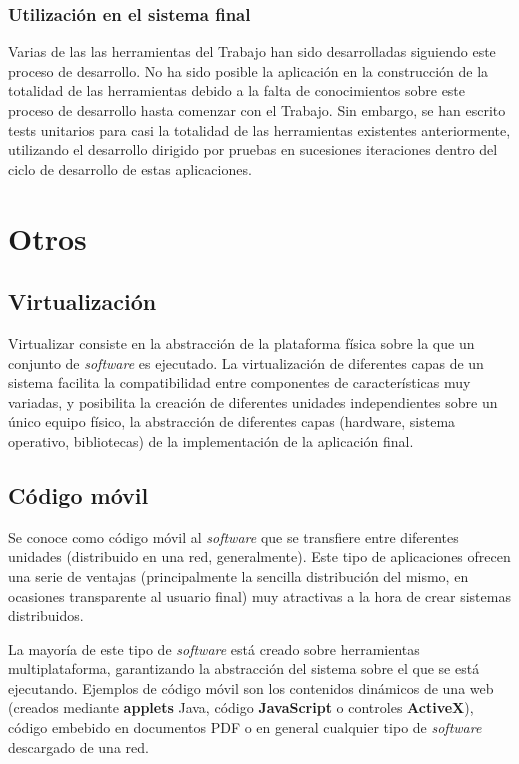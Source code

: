 \subsubsection{Utilización en el sistema final}

Varias de las las herramientas del Trabajo han sido desarrolladas siguiendo este proceso de desarrollo. No ha sido posible la aplicación en la construcción de la totalidad de las herramientas debido a la falta de conocimientos sobre este proceso de desarrollo hasta comenzar con el Trabajo. Sin embargo, se han escrito tests unitarios para casi la totalidad de las herramientas existentes anteriormente, utilizando el desarrollo dirigido por pruebas en sucesiones iteraciones dentro del ciclo de desarrollo de estas aplicaciones.



\section{Otros}

\subsection{Virtualización}
\label{teoria:virtualizacion}

Virtualizar consiste en la abstracción de la plataforma física sobre la que un conjunto de \textit{software} es ejecutado. La virtualización de diferentes capas de un sistema facilita la compatibilidad entre componentes de características muy variadas, y posibilita la creación de diferentes unidades independientes sobre un único equipo físico, la abstracción de diferentes capas (hardware, sistema operativo, bibliotecas) de la implementación de la aplicación final.

\subsection{Código móvil}
\label{teoria:codigomovil}

Se conoce como código móvil al \textit{software} que se transfiere entre diferentes unidades (distribuido en una red, generalmente). Este tipo de aplicaciones ofrecen una serie de ventajas (principalmente la sencilla distribución del mismo, en ocasiones transparente al usuario final) muy atractivas a la hora de crear sistemas distribuidos.

La mayoría de este tipo de \textit{software} está creado sobre herramientas multiplataforma, garantizando la abstracción del sistema sobre el que se está ejecutando. Ejemplos de código móvil son los contenidos dinámicos de una web (creados mediante \textbf{applets} Java, código \textbf{JavaScript} o controles \textbf{ActiveX}), código embebido en documentos PDF o en general cualquier tipo de \textit{software} descargado de una red.

